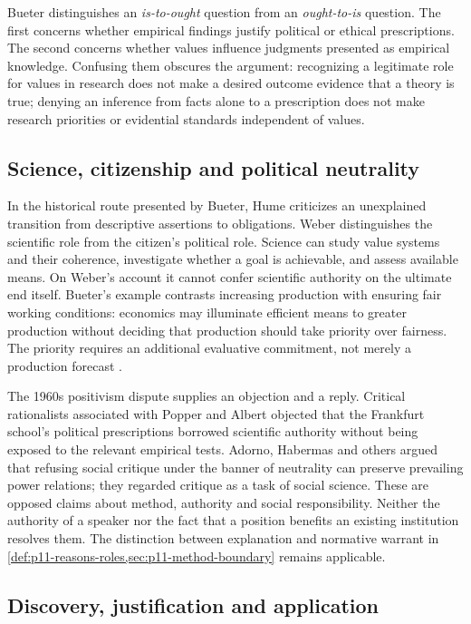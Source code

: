 Bueter distinguishes an \emph{is-to-ought} question from an
\emph{ought-to-is} question. The first concerns whether empirical findings
justify political or ethical prescriptions. The second concerns whether
values influence judgments presented as empirical knowledge. Confusing
them obscures the argument: recognizing a legitimate role for values in
research does not make a desired outcome evidence that a theory is true;
denying an inference from facts alone to a prescription does not make
research priorities or evidential standards independent of values.

\subsection{Science, citizenship and political neutrality}

In the historical route presented by Bueter, Hume criticizes an unexplained
transition from descriptive assertions to obligations. Weber distinguishes
the scientific role from the citizen's political role. Science can study
value systems and their coherence, investigate whether a goal is achievable,
and assess available means. On Weber's account it cannot confer scientific
authority on the ultimate end itself. Bueter's example contrasts increasing
production with ensuring fair working conditions: economics may illuminate
efficient means to greater production without deciding that production
should take priority over fairness. The priority requires an additional
evaluative commitment, not merely a production forecast
\cite[sec.~1.1, pp.~757--758]{Bueter2021ValueFreedom}.

The 1960s positivism dispute supplies an objection and a reply. Critical
rationalists associated with Popper and Albert objected that the Frankfurt
school's political prescriptions borrowed scientific authority without
being exposed to the relevant empirical tests. Adorno, Habermas and others
argued that refusing social critique under the banner of neutrality can
preserve prevailing power relations; they regarded critique as a task of
social science. These are opposed claims about method, authority and social
responsibility. Neither the authority of a speaker nor the fact that a
position benefits an existing institution resolves them. The distinction
between explanation and normative warrant in
\cref{def:p11-reasons-roles,sec:p11-method-boundary} remains applicable.

\subsection{Discovery, justification and application}

